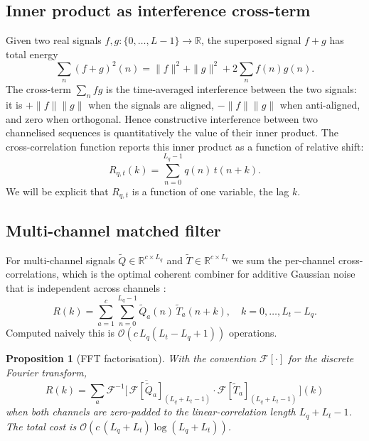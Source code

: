 \documentclass[twocolumn,11pt,a4paper]{article}
\newtheorem{proposition}[theorem]{Proposition}
\theoremstyle{definition}
\theoremstyle{remark}
\newcommand{\bigO}{\mathcal{O}}
\newcommand{\R}{\mathbb{R}}
\newcommand{\F}{\mathcal{F}}
\begin{document}
\subsection{Inner product as interference cross-term}

Given two real signals $f, g : \{0, \dots, L - 1\} \to \R$, the
superposed signal $f + g$ has total energy
\begin{equation}
    \sum_n (f + g)^2(n) = \|f\|^2 + \|g\|^2 + 2 \sum_n f(n) g(n).
\end{equation}
The cross-term $\sum_n f g$ is the time-averaged interference between
the two signals: it is $+\|f\| \|g\|$ when the signals are aligned,
$-\|f\| \|g\|$ when anti-aligned, and zero when orthogonal. Hence
constructive interference between two channelised sequences is
quantitatively the value of their inner product. The cross-correlation
function reports this inner product as a function of relative shift:
\begin{equation}
    R_{q,t}(k) = \sum_{n=0}^{L_q - 1} q(n) \, t(n + k).
\end{equation}
We will be explicit that $R_{q, t}$ is a function of one variable, the
lag $k$.

\subsection{Multi-channel matched filter}

For multi-channel signals $\tilde Q \in \R^{c \times L_q}$ and
$\tilde T \in \R^{c \times L_t}$ we sum the per-channel cross-correlations,
which is the optimal coherent combiner for additive Gaussian noise that
is independent across channels \citep{vantrees2001, kay1998}:
\begin{equation}
    R(k) = \sum_{a=1}^{c} \sum_{n=0}^{L_q - 1} \tilde Q_{a}(n) \, \tilde T_{a}(n+k),
    \quad k = 0, \dots, L_t - L_q.
    \label{eq:multich}
\end{equation}
Computed naively this is $\bigO(c \, L_q (L_t - L_q + 1))$ operations.

\begin{proposition}[FFT factorisation]
\label{prop:fft}
With the convention $\F[\cdot]$ for the discrete Fourier transform,
\begin{equation}
    R(k)
    = \sum_a \F^{-1}\!\Big[\, \overline{\F[\tilde Q_a]}_{(L_q + L_t - 1)} \cdot \F[\tilde T_a]_{(L_q + L_t - 1)} \,\Big](k)
\end{equation}
when both channels are zero-padded to the linear-correlation length
$L_q + L_t - 1$. The total cost is $\bigO\!\left( c \, (L_q + L_t) \log(L_q + L_t) \right)$.
\end{proposition}
\end{document}
